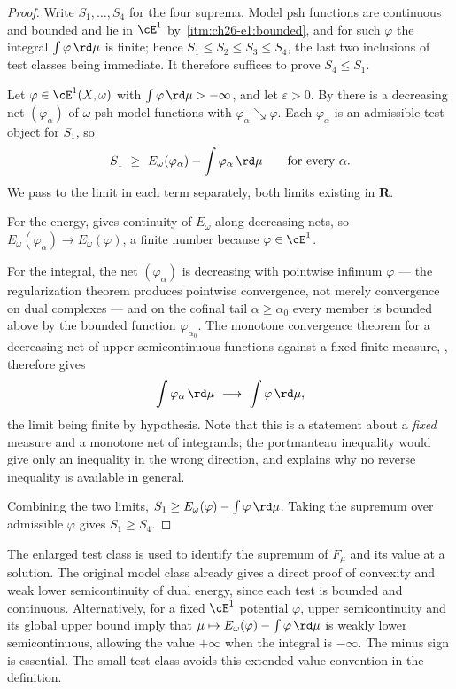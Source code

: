 \begin{proof}
Write $S_1,\ldots,S_4$ for the four suprema.  Model psh functions are
continuous and bounded and lie in $\cE^1$ by
\,\cref{itm:ch26-e1:bounded}, and for such
$\varphi$ the integral $\int\varphi\,\rd\mu$ is finite; hence
$S_1\leq S_2\leq S_3\leq S_4$, the last two inclusions of test classes
being immediate.  It therefore suffices to prove $S_4\leq S_1$.

Let $\varphi\in\cE^1(X,\omega)$ with $\int\varphi\,\rd\mu>-\infty$, and
let $\varepsilon>0$.  By  there is
a decreasing net $(\varphi_\alpha)$ of $\omega$-psh model functions with
$\varphi_\alpha\searrow\varphi$.  Each $\varphi_\alpha$ is an admissible
test object for $S_1$, so
\[
 S_1\ \geq\ E_\omega(\varphi_\alpha)-\int\varphi_\alpha\,\rd\mu
 \qquad\text{for every }\alpha .
\]
We pass to the limit in each term separately, both limits existing in
$\mathbf R$.

For the energy,  gives continuity of
$E_\omega$ along decreasing nets, so
$E_\omega(\varphi_\alpha)\to E_\omega(\varphi)$, a finite number because
$\varphi\in\cE^1$.

For the integral, the net $(\varphi_\alpha)$ is decreasing with pointwise
infimum $\varphi$ --- the regularization theorem produces pointwise
convergence, not merely convergence on dual complexes --- and on the cofinal tail
$\alpha\geq\alpha_0$ every member is bounded above by the bounded
function $\varphi_{\alpha_0}$.  The monotone convergence theorem
for a decreasing net of upper semicontinuous functions against a fixed finite
measure, , therefore gives
\[
 \int\varphi_\alpha\,\rd\mu\ \longrightarrow\ \int\varphi\,\rd\mu ,
\]
the limit being finite by hypothesis.  Note that this is a statement about a
\emph{fixed} measure and a monotone net of integrands; the portmanteau
inequality  would give only an inequality in the
wrong direction, and  explains why no
reverse inequality is available in general.

Combining the two limits, $S_1\geq E_\omega(\varphi)-\int\varphi\,\rd\mu$.
Taking the supremum over admissible $\varphi$ gives $S_1\geq S_4$.
\end{proof}

\begin{remark}
\label{rem:ch28-test-class-use}
The enlarged test class is used to identify the supremum of $F_\mu$
and its value at a solution.  The original model class already gives
a direct proof of convexity and weak lower semicontinuity of dual
energy, since each test is bounded and continuous.  Alternatively,
for a fixed $\cE^1$ potential $\varphi$, upper semicontinuity and its
global upper bound imply that
$\mu\mapsto E_\omega(\varphi)-\int\varphi\,\rd\mu$ is weakly lower
semicontinuous, allowing the value $+\infty$ when the integral is
$-\infty$.  The minus sign is essential.  The small test class avoids
this extended-value convention in the definition.
\end{remark}

